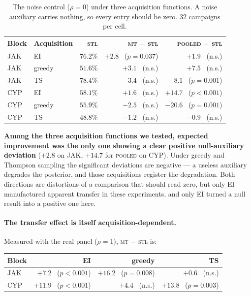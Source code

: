 \documentclass[11pt]{article}
\newcommand{\stl}{\textsc{stl}}
\newcommand{\mt}{\textsc{mt}}
\newcommand{\pooled}{\textsc{pooled}}
\begin{document}
\begin{table}[ht]
\centering\small
\begin{tabular}{llrrr}
\toprule
Block & Acquisition & \stl{} & \mt{} $-$ \stl{} & \pooled{} $-$ \stl{} \\
\midrule
JAK & EI     & $76.2\%$ & $\mathbf{+2.8}$ \ ($p=0.037$) & $+1.9$ \ (n.s.) \\
JAK & greedy & $51.6\%$ & $+3.1$ \ (n.s.) & $+7.5$ \ (n.s.) \\
JAK & TS     & $78.4\%$ & $-3.4$ \ (n.s.) & $\mathbf{-8.1}$ \ ($p=0.001$) \\
\midrule
CYP & EI     & $58.1\%$ & $+1.6$ \ (n.s.) & $\mathbf{+14.7}$ \ ($p<0.001$) \\
CYP & greedy & $55.9\%$ & $-2.5$ \ (n.s.) & $\mathbf{-20.6}$ \ ($p=0.001$) \\
CYP & TS     & $48.8\%$ & $-1.2$ \ (n.s.) & $-0.9$ \ (n.s.) \\
\bottomrule
\end{tabular}
\caption{The noise control ($\rho = 0$) under three acquisition
functions. A noise auxiliary carries nothing, so every entry should be zero.
32 campaigns per cell.}
\label{tab:acqnull}
\end{table}

\textbf{Among the three acquisition functions we tested, expected improvement
was the only one showing a clear positive null-auxiliary deviation} ($+2.8$ on JAK, $+14.7$ for
\pooled{} on CYP). Under greedy and Thompson sampling the significant deviations
are negative --- a useless auxiliary degrades the posterior, and those
acquisitions register the degradation. Both directions are distortions of a
comparison that should read zero, but only EI manufactured apparent transfer in these
experiments, and only EI turned a null result into a positive one here.

\paragraph{The transfer effect is itself acquisition-dependent.} Measured with
the real panel ($\rho = 1$), \mt{} $-$ \stl{} is:

\begin{center}\small
\begin{tabular}{lrrr}
\toprule
Block & EI & greedy & TS \\
\midrule
JAK & $+7.2$ \ ($p<0.001$) & $+16.2$ \ ($p=0.008$) & $+0.6$ \ (n.s.) \\
CYP & $+11.9$ \ ($p<0.001$) & $+4.4$ \ (n.s.) & $+13.8$ \ ($p=0.003$) \\
\bottomrule
\end{tabular}
\end{center}
\end{document}
